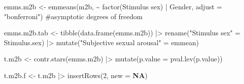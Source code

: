 \documentclass[
  bookmarksnumbered]{article}
\newenvironment{Shaded}{\begin{snugshade}}{\end{snugshade}}
\newcommand{\AttributeTok}[1]{\textcolor[rgb]{0.80,0.80,0.80}{#1}}
\newcommand{\CommentTok}[1]{\textcolor[rgb]{0.50,0.62,0.50}{#1}}
\newcommand{\ConstantTok}[1]{\textcolor[rgb]{0.86,0.64,0.64}{\textbf{#1}}}
\newcommand{\DecValTok}[1]{\textcolor[rgb]{0.86,0.86,0.80}{#1}}
\newcommand{\FunctionTok}[1]{\textcolor[rgb]{0.94,0.94,0.56}{#1}}
\newcommand{\NormalTok}[1]{\textcolor[rgb]{0.80,0.80,0.80}{#1}}
\newcommand{\OtherTok}[1]{\textcolor[rgb]{0.94,0.94,0.56}{#1}}
\newcommand{\SpecialCharTok}[1]{\textcolor[rgb]{0.86,0.64,0.64}{#1}}
\newcommand{\StringTok}[1]{\textcolor[rgb]{0.80,0.58,0.58}{#1}}
\begin{document}
\begin{Shaded}
\begin{Highlighting}[]
\NormalTok{emms.m2b }\OtherTok{\textless{}{-}} \FunctionTok{emmeans}\NormalTok{(m2b, }\SpecialCharTok{\textasciitilde{}} \FunctionTok{factor}\NormalTok{(}\StringTok{\textasciigrave{}}\AttributeTok{Stimulus sex}\StringTok{\textasciigrave{}}\NormalTok{) }\SpecialCharTok{|}\NormalTok{ Gender,}
                    \AttributeTok{adjust =} \StringTok{"bonferroni"}\NormalTok{) }\CommentTok{\#asymptotic degrees of freedom}

\NormalTok{emms.m2b.tab }\OtherTok{\textless{}{-}} \FunctionTok{tibble}\NormalTok{(}\FunctionTok{data.frame}\NormalTok{(emms.m2b)) }\SpecialCharTok{|\textgreater{}}
  \FunctionTok{rename}\NormalTok{(}\StringTok{"Stimulus sex"} \OtherTok{=}\NormalTok{ Stimulus.sex) }\SpecialCharTok{|\textgreater{}} 
  \FunctionTok{mutate}\NormalTok{(}\StringTok{"Subjective sexual arousal"} \OtherTok{=}\NormalTok{ emmean)}

\NormalTok{t.m2b }\OtherTok{\textless{}{-}} \FunctionTok{contr.stars}\NormalTok{(emms.m2b) }\SpecialCharTok{|\textgreater{}} 
  \FunctionTok{mutate}\NormalTok{(}\AttributeTok{p.value =} \FunctionTok{pval.lev}\NormalTok{(p.value))}

\NormalTok{t.m2b.f }\OtherTok{\textless{}{-}}\NormalTok{ t.m2b }\SpecialCharTok{|\textgreater{}} 
  \FunctionTok{insertRows}\NormalTok{(}\DecValTok{2}\NormalTok{, }\AttributeTok{new =} \ConstantTok{NA}\NormalTok{)}


\end{Highlighting}
\end{Shaded}
\end{document}
